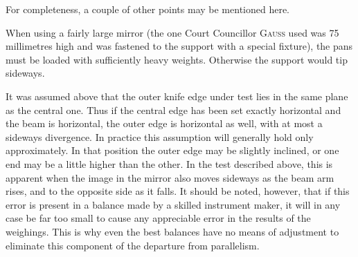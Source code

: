 For completeness, a couple of other points may be mentioned here.

When using a fairly large mirror (the one Court Councillor \textsc{Gauss} used was 75 millimetres high and was fastened to the support with a special fixture), the pans must be loaded with sufficiently heavy weights. Otherwise the support would tip sideways.

It was assumed above that the outer knife edge under test lies in the same plane as the central one. Thus if the central edge has been set exactly horizontal and the beam is horizontal, the outer edge is horizontal as well, with at most a sideways divergence. In practice this assumption will generally hold only approximately. In that position the outer edge may be slightly inclined, or one end may be a little higher than the other. In the test described above, this is apparent when the image in the mirror also moves sideways as the beam arm rises, and to the opposite side as it falls. It should be noted, however, that if this error is present in a balance made by a skilled instrument maker, it will in any case be far too small to cause any appreciable error in the results of the weighings. This is why even the best balances have no means of adjustment to eliminate this component of the departure from parallelism.

